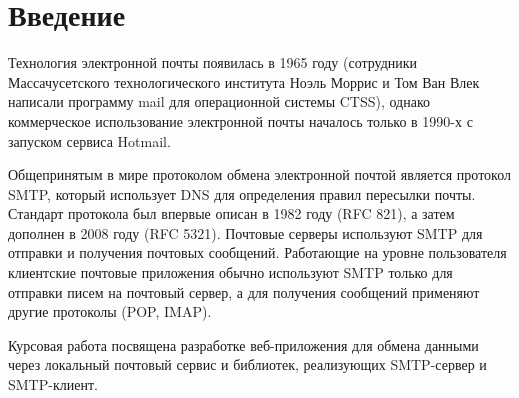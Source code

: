 \chapter*{Введение}

Технология электронной почты появилась в 1965 году (сотрудники Массачусетского технологического института Ноэль Моррис и Том Ван Влек написали программу mail для операционной системы CTSS), однако коммерческое использование электронной почты началось только в 1990-х с запуском сервиса Hotmail.

Общепринятым в мире протоколом обмена электронной почтой является протокол SMTP, который использует DNS для определения правил пересылки почты. Стандарт протокола был впервые описан в 1982 году (RFC 821), а затем дополнен в 2008 году (RFC 5321). Почтовые серверы используют SMTP для отправки и получения почтовых сообщений. Работающие на уровне пользователя клиентские почтовые приложения обычно используют SMTP только для отправки писем на почтовый сервер, а для получения сообщений применяют другие протоколы (POP, IMAP).

Курсовая работа посвящена разработке веб-приложения для обмена данными через локальный почтовый сервис и библиотек, реализующих SMTP-сервер и SMTP-клиент.